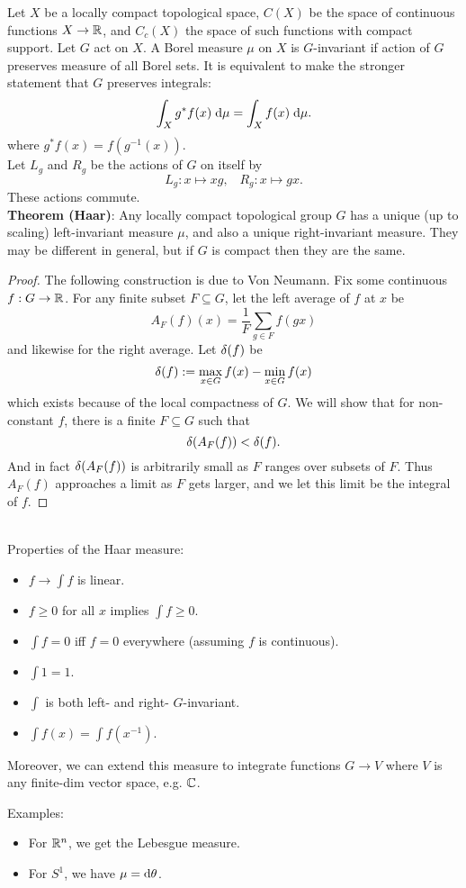 \documentclass{amsart}
\begin{document}
\medspace

Let $X$ be a locally compact topological space, $C(X)$ be the space of continuous functions $X\to \mathbb{R}$, and $C_c(X)$ the space of such functions with compact support. Let $G$ act on $X$. A Borel measure $\mu$ on $X$ is $G$-invariant if action of $G$ preserves measure of all Borel sets. It is equivalent to make the stronger statement that $G$ preserves integrals:
$$
\int_Xg^*f(x) \; \textrm{d} \mu = \int_Xf(x) \; \textrm{d} \mu .
$$
where $g^*f(x) = f(g^{-1}(x))$.\\

Let $L_g$ and $R_g$ be the actions of $G$ on itself by
$$
L_g:x\mapsto xg, \;\;\; R_g:x\mapsto gx.
$$
These actions commute.\\

\textbf{Theorem (Haar)}: Any locally compact topological group $G$ has a unique (up to scaling) left-invariant measure $\mu$, and also a unique right-invariant measure. They may be different in general, but if $G$ is compact then they are the same.
\begin{proof}
	The following construction is due to Von Neumann. Fix some continuous $f:G\to \mathbb{R}$. For any finite subset $F\subseteq G$, let the left average of $f$ at $x$ be
	$$
	A_F(f)(x) = \frac{1}{F} \sum_{g\in F} f(gx)
	$$
	and likewise for the right average. Let $\delta(f)$ be 
	$$
	\delta(f) := \max_{x\in G} f(x) - \min_{x\in G} f(x)
	$$
	which exists because of the local compactness of $G$. We will show that for non-constant $f$, there is a finite $F\subseteq G$ such that 
	$$
	\delta(A_F(f)) < \delta(f).
	$$
	And in fact $\delta(A_F(f))$ is arbitrarily small as $F$ ranges over subsets of $F$. Thus $A_F(f)$ approaches a limit as $F$ gets larger, and we let this limit be the integral of $f$.
\end{proof}\\

Properties of the Haar measure:
\begin{itemize}
	\item $f\to \int f$ is linear.
	\item $f\geq 0$ for all $x$ implies $\int f\geq 0$.
	\item $\int f = 0$ iff $f=0$ everywhere (assuming $f$ is continuous).
	\item $\int 1 = 1$.
	\item $\int$ is both left- and right- $G$-invariant.
	\item $\int f(x) = \int f(x^{-1})$.
\end{itemize}
\medspace

Moreover, we can extend this measure to integrate functions $G\to V$ where $V$ is any finite-dim vector space, e.g. $\mathbb{C}$.

Examples:
\begin{itemize}
	\item For $\mathbb{R}^n$, we get the Lebesgue measure.
	\item For $S^1$, we have $\mu= \textrm{d} \theta$. 
\end{itemize}
\end{document}
